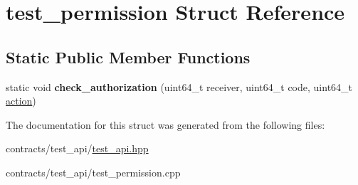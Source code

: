 \hypertarget{structtest__permission}{}\section{test\+\_\+permission Struct Reference}
\label{structtest__permission}
\subsection*{Static Public Member Functions}
\begin{DoxyCompactItemize}
\item 
\mbox{\label{structtest__permission_a4c059e74414c1442eed9daa002ddca1a}} 
static void {\bfseries check\+\_\+authorization} (uint64\+\_\+t receiver, uint64\+\_\+t code, uint64\+\_\+t \mbox{\hyperlink{structaacio_1_1action}{action}})
\end{DoxyCompactItemize}


The documentation for this struct was generated from the following files\+:\begin{DoxyCompactItemize}
\item 
contracts/test\+\_\+api/\mbox{\hyperlink{test__api_8hpp}{test\+\_\+api.\+hpp}}\item 
contracts/test\+\_\+api/test\+\_\+permission.\+cpp\end{DoxyCompactItemize}
